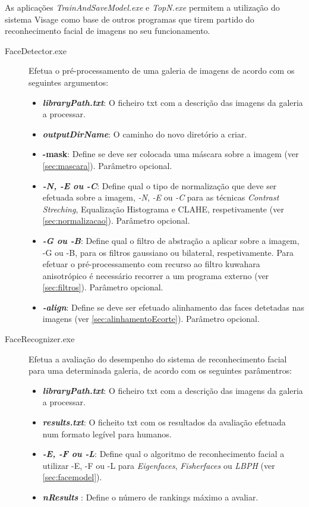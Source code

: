 As aplicações \textit{TrainAndSaveModel.exe} e \textit{TopN.exe} permitem a utilização do sistema Visage como base de outros programas que tirem partido do reconhecimento facial de imagens no seu funcionamento.

\begin{description}
\item[FaceDetector.exe] Efetua o pré-processamento de uma galeria de imagens de acordo com os seguintes argumentos:

\begin{itemize}
\item \textbf{\textit{libraryPath.txt}}: O ficheiro txt com a descrição das imagens da galeria a processar.
\item \textbf{\textit{outputDirName}}: O caminho do novo diretório a criar.
\item \textbf{-mask}: Define se deve ser colocada uma máscara sobre a imagem (ver \ref{sec:mascara}). Parâmetro opcional.
\item \textbf{\textit{-N, -E ou -C}}: Define qual o tipo de normalização que deve ser efetuada sobre a imagem, \textit{-N}, \textit{-E} ou \textit{-C} para as técnicas \textit{Contrast Streching}, Equalização Histograma e CLAHE, respetivamente (ver \ref{sec:normalizacao}). Parâmetro opcional.
\item \textbf{\textit{-G ou -B}}: Define qual o filtro de abstração a aplicar sobre a imagem, -G ou -B, para os filtros gaussiano ou bilateral, respetivamente. Para efetuar o pré-processamento com recurso ao filtro kuwahara anisotrópico é necessário recorrer a um programa externo (ver \ref{sec:filtros}). Parâmetro opcional.
\item \textbf{\textit{-align}}: Define se deve ser efetuado alinhamento das faces detetadas nas imagens (ver \ref{sec:alinhamentoEcorte}). Parâmetro opcional.
\end{itemize}

\item[FaceRecognizer.exe] Efetua a avaliação do desempenho do sistema de reconhecimento facial para uma determinada galeria, de acordo com os seguintes parâmentros:

\begin{itemize}
\item \textbf{\textit{libraryPath.txt}}: O ficheiro txt com a descrição das imagens da galeria a processar.
\item \textbf{\textit{results.txt}}: O ficheito txt com os resultados da avaliação efetuada num formato legível para humanos.
\item \textbf{\textit{-E, -F ou -L}}: Define qual o algoritmo de reconhecimento facial a utilizar -E, -F ou -L para \textit{Eigenfaces}, \textit{Fisherfaces} ou \textit{LBPH} (ver \ref{sec:facemodel}).
\item \textbf{\textit{nResults }}: Define o número de rankings máximo a avaliar.
\end{itemize}


\end{description}
